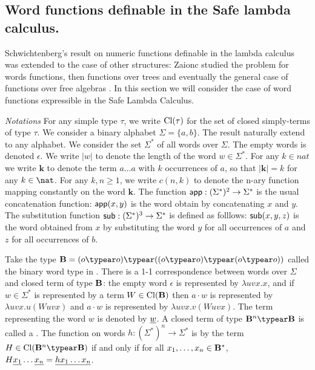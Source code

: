 \newcommand{\openedof}[2]{{\rm Op}(#1,#2)} %

\newcommand\wordnum[1]{\mathbf{#1}} %
\newcommand\safedefset{$\lambda^{safe}${\rm def}}

\newcommand\fatlambda{\lambda\kern-0.7em\lambda}
\newcommand\wordapp{{\sf app}}
\newcommand\wordsub{{\sf sub}}


\subsection{Word functions definable in the Safe lambda calculus.}
Schwichtenberg's result on numeric functions definable in the lambda
calculus was extended to the case of other structures: Zaionc
studied the problem for words functions, then functions over trees
and eventually the general case of functions over free algebras
\cite{DBLP:journals/tcs/Leivant93,DBLP:journals/apal/Zaionc91,702481,DBLP:journals/tcs/Zaionc87}.
In this section we will consider the case of word functions
expressible in the Safe Lambda Calculus.
\smallskip

\emph{Notations} For any simple type $\tau$, we write
${\rm Cl}(\tau)$ for the set of closed simply-terms of type $\tau$.
We consider a binary alphabet $\Sigma = \{a,b\}$. The result
naturally extend to any alphabet. We consider the set $\Sigma^*$ of
all words over $\Sigma$. The empty words is denoted $\epsilon$. We
write $|w|$ to denote the length of the word $w\in\Sigma^*$. For any
$k\in nat$ we write $\wordnum{k}$ to denote the term $a \ldots a$
with $k$ occurrences of $a$, so that $|\wordnum{k}| = k$ for any
$k\in\nat$. For any $k,n\geq 1$, we write $c(n,k)$ to denote the
n-ary function mapping constantly on the word $\wordnum{k}$. The
function $\wordapp : (\Sigma^*)^2 \rightarrow \Sigma^*$ is the usual
concatenation function: $\wordapp(x,y)$ is the word obtain by
concatenating $x$ and $y$. The substitution function $\wordsub :
(\Sigma^*)^3 \rightarrow \Sigma^*$ is defined as folllows:
$\wordsub(x,y,z)$ is the word obtained from $x$ by substituting the
word $y$ for all occurrences of $a$ and $z$ for all occurrences of
$b$.

Take the type $\zaiwordtyp = (o\typear o)\typear ((o\typear
o)\typear (o\typear o))$ called the binary word type in
\cite{DBLP:journals/tcs/Zaionc87}. There is a 1-1 correspondence
between words over $\Sigma$ and closed term of type $\mathbf{B}$:
the empty word $\epsilon$ is represented by $\lambda u v x.x$, and
if $w\in \Sigma^*$ is represented by a term $W \in
{\rm Cl}(\mathbf{B})$ then $a \cdot w$ is represented by $\lambda
u v x. u(W uvx)$ and $a \cdot w$ is represented by $\lambda u v x.
v(W uvx)$. The term representing the word $w$ is denoted by
$\underline{w}$. A closed term of type $\zaiwordtyp^n \typear
\zaiwordtyp$ is called a . The function on words $h:(\Sigma^*)^n \rightarrow
\Sigma^*$ is  by the term $H \in
\closedof{\zaiwordtyp^n \typear \zaiwordtyp}$ if and only if for all
$x_1, \ldots, x_n \in \mathbf{B}^*$, $H \underline{x_1} \ldots
\underline{x_n} = \underline{h x_1 \ldots x_n}$. \bigskip

